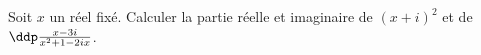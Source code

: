 
\begin{exercice}  \;
Soit $x$ un r\'eel fix\'e. Calculer la partie r\'eelle et imaginaire de 
$(x+i)^2$ et de $\ddp\frac{x-3i}{x^2+1-2ix}$.
\end{exercice}